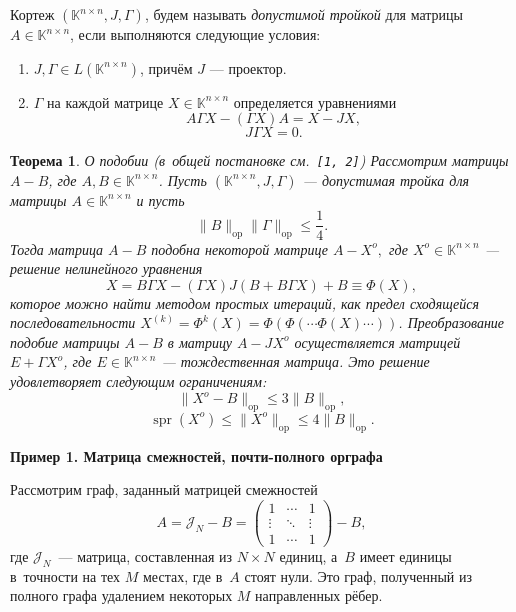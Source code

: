 \documentclass[12pt]{article}
\newtheorem*{ksvthm*}{Теорема}
\theoremstyle{definition}
\begin{document}
Кортеж \( (\mathbb{K}^{n{\times}n}, J, \Gamma) \),
    будем называть \emph{допустимой тройкой}
    для матрицы \( A\in\mathbb{K}^{n\times n} \),
    если выполняются следующие условия:
\begin{enumerate}
\item
    \( J,\Gamma\in L(\mathbb{K}^{n{\times}n}) \),
    причём \( J \) --- проектор.
\item
    \( \Gamma \) на каждой матрице \( X\in \mathbb{K}^{n\times n} \)
    определяется уравнениями
    \[ A\Gamma X - (\Gamma X) A = X - JX, \]
    \[ J\Gamma X = 0. \]
\end{enumerate}

\begin{ksvthm*}{О подобии (в~общей постановке см.~\texttt{[1, 2]})}
    Рассмотрим матрицы \( A-B \),
        где \( A,B\in \mathbb{K}^{n{\times}n} \).
    Пусть \( (\mathbb{K}^{n\times n}, J, \Gamma) \)
        --- допустимая тройка для матрицы \( A\in\mathbb{K}^{n{\times}n} \)
        и пусть
    \[
        \|B\|_{\mathrm{op}} \|\Gamma\|_{\mathrm{op}} \leq \frac14.
        \]
    Тогда матрица \( A-B \)
        подобна некоторой матрице \( A-X^o, \)
        где \( X^o\in\mathbb{K}^{n{\times}n} \)
        --- решение нелинейного уравнения
    \[
        X = B\Gamma X - (\Gamma X)J(B + B\Gamma X) + B \equiv \Phi(X),
        \]
        которое можно найти методом простых итераций,
        как предел сходящейся последовательности
        \( X^{(k)} = \Phi^{k}(X) = \Phi(\Phi(\cdots\Phi(X)\cdots)) \).
    Преобразование подобие матрицы \( A-B \)
        в матрицу \( A-JX^o \) осуществляется
        матрицей \( E+\Gamma X^o \),
        где \( E\in\mathbb{K}^{n{\times}n} \) --- тождественная матрица.
    Это решение удовлетворяет следующим ограничениям:
    \[ \|X^o - B\|_{\mathrm{op}} \leq 3\|B\|_{\mathrm{op}}, \]
    \[ \operatorname{spr}(X^o) \leq \|X^o\|_{\mathrm{op}} \leq 4\|B\|_{\mathrm{op}}. \]
\end{ksvthm*}

\smallskip\textbf{Пример 1. Матрица смежностей, почти-полного орграфа}\smallskip

Рассмотрим граф, заданный матрицей смежностей
\[ A = \mathcal{J}_N - B =
   \begin{pmatrix}1 & \cdots & 1\\ \vdots & \ddots & \vdots \\ 1 & \cdots & 1\end{pmatrix} - B,
   \]
    где \( \mathcal{J}_N \)~--- матрица, составленная из \( N{\times}N \) единиц,
    а~\( B \) имеет единицы в~точности на тех \( M \) местах,
    где в~\( A \) стоят нули.
Это граф, полученный из полного графа
    удалением некоторых \( M \) направленных рёбер.
\end{document}
